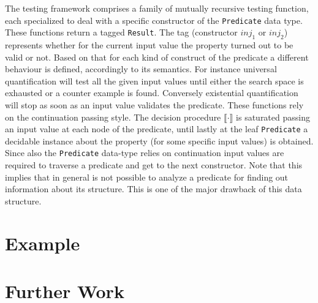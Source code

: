\documentclass[10pt,a4paper]{report}
\begin{document}

The testing framework comprises a family of mutually recursive testing function, each specialized to deal with a specific constructor of the \texttt{Predicate} data type. These functions return a tagged \texttt{Result}.
The tag (constructor $inj_1$ or $inj_2$) represents whether for the current input value the property turned out to be valid or not.
Based on that for each kind of construct of the predicate a different behaviour is defined, accordingly to its semantics.
For instance universal quantification will test all the given input values until either the search space is exhausted or a counter example is found. Conversely existential quantification will stop as soon as an input value validates the predicate.
These functions rely on the continuation passing style.
The decision procedure $\llbracket \cdot \rrbracket$ is saturated passing an input value at each node of the predicate, until lastly at the leaf \texttt{Predicate} a decidable instance about the property (for some specific input values) is obtained.
Since also the \texttt{Predicate} data-type relies on continuation input values are required to traverse a predicate and get to the next constructor.
Note that this implies that in general is not possible to analyze a predicate for finding out information about its structure. This is one of the major drawback of this data structure.

\section*{Example}

\section*{Further Work}
\end{document}
